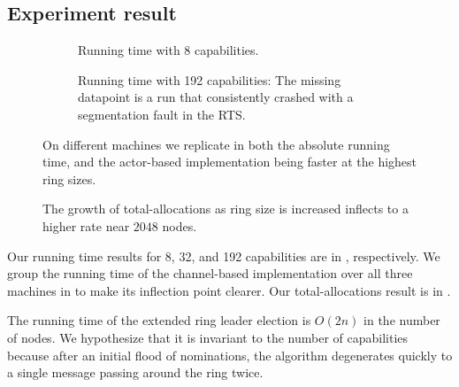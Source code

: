 \documentclass[sigplan,screen]{acmart}
\begin{document}
\subsection{Experiment result}
\label{apx:exp-result}

\begin{figure}
    \begin{subfigure}{\linewidth}
    {\small
        \def\svgwidth{\linewidth}
        
    }
    \caption{Running time with 8 capabilities.}
    \label{fig:perf-eval-time-n8}
    \end{subfigure}

    \begin{subfigure}{\linewidth}
    {\small
        \def\svgwidth{\linewidth}
        
    }
    \caption{
        Running time with 192 capabilities:
        The missing datapoint is a run that consistently crashed with a segmentation fault in the RTS.
    }
    \label{fig:perf-eval-time-n192}
    \end{subfigure}

\caption{
    On different machines we replicate
     in both the absolute running time, and
    the actor-based implementation being faster at the highest
    ring sizes.
}
\label{fig:perf-eval-time-rest}
\end{figure}

\begin{figure}
    {\small
        \def\svgwidth{\linewidth}
        
    }
    \caption{
        The growth of total-allocations as ring size is increased inflects to a
        higher rate near $2048$ nodes.
    }
    \label{fig:perf-group-chan}
\end{figure}

Our running time results for 8, 32, and 192 capabilities are in
,
respectively.
%
We group the running time of the channel-based implementation over all three
machines in  to make its inflection point clearer.
%
Our total-allocations result is in .

The running time of the extended ring leader election is $O(2n)$ in the number
of nodes.
%
We hypothesize that it is invariant to the number of capabilities because after
an initial flood of nominations, the algorithm degenerates quickly to a single
message passing around the ring twice.
\end{document}
